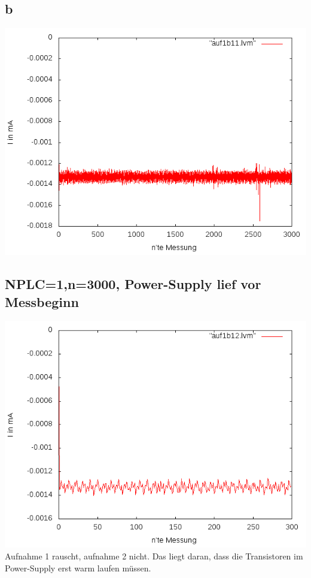 \documentclass[compress,11pt]{beamer}
\begin{document}
\subsection{b}
\begin{frame}
\includegraphics[width=\textwidth]{images/auf1b11_lines.png}

\end{frame}
\begin{frame}
\subsection{NPLC=1,n=3000, Power-Supply lief vor Messbeginn}
\includegraphics[width=\textwidth]{images/auf1b12_lines.png}
Aufnahme 1 rauscht, aufnahme 2 nicht. Das liegt daran, dass die Transistoren im Power-Supply erst warm laufen müssen. 
\end{frame}
\end{document}
